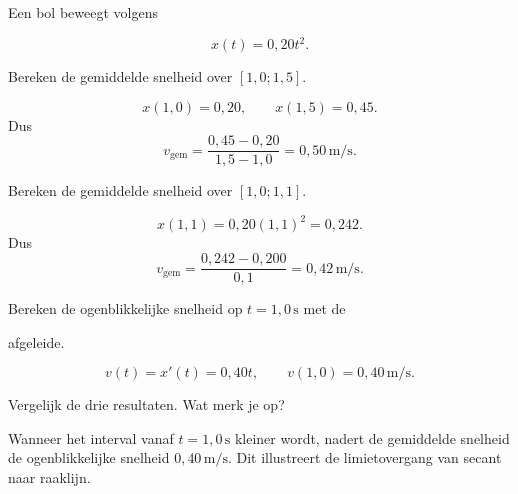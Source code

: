 \documentclass{ximera}
\begin{document}
\begin{oefening}{\oefU\ESS}

Een bol beweegt volgens

\[x(t)=0,20t^2.\]

\begin{question}

Bereken de gemiddelde snelheid over $[1,0;1,5]$.

\begin{oplossing}
\[x(1,0)=0,20,\qquad x(1,5)=0,45.\]
Dus
\[v_{\mathrm{gem}}=\frac{0,45-0,20}{1,5-1,0}=0,50\,\mathrm{m/s}.\]
\end{oplossing}

\end{question}

\begin{question}

Bereken de gemiddelde snelheid over $[1,0;1,1]$.

\begin{oplossing}
\[x(1,1)=0,20(1,1)^2=0,242.\]
Dus
\[v_{\mathrm{gem}}=\frac{0,242-0,200}{0,1}=0,42\,\mathrm{m/s}.\]
\end{oplossing}

\end{question}

\begin{question}

Bereken de ogenblikkelijke snelheid op $t=1,0\,\mathrm{s}$ met de

afgeleide.

\begin{oplossing}
\[v(t)=x'(t)=0,40t, \qquad v(1,0)=0,40\,\mathrm{m/s}.\]
\end{oplossing}

\end{question}

\begin{question}

Vergelijk de drie resultaten. Wat merk je op?

\begin{oplossing}
Wanneer het interval vanaf \(t=1,0\,\mathrm{s}\) kleiner wordt, nadert de gemiddelde snelheid de ogenblikkelijke snelheid \(0,40\,\mathrm{m/s}\). Dit illustreert de limietovergang van secant naar raaklijn.
\end{oplossing}

\end{question}

\end{oefening}
\end{document}
